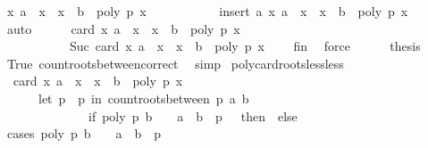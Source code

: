 \begin{isabellebody}
\ {\isachardoublequoteopen}{\isacharbraceleft}x{\isachardot}\ a\ {\isasymle}\ x\ {\isasymand}\ x\ {\isasymle}\ b\ {\isasymand}\ poly\ p\ x\ {\isacharequal}\ {}{\isacharbraceright}\ {\isacharequal}\isanewline
\ \ \ \ \ \ \ \ insert\ a\ {\isacharbraceleft}x{\isachardot}\ a\ {\isacharless}\ x\ {\isasymand}\ x\ {\isasymle}\ b\ {\isasymand}\ poly\ p\ x\ {\isacharequal}\ {}{\isacharbraceright}{\isachardoublequoteclose}\ \isamarkupfalse%
\ auto\isanewline
\ \ \ \ \isamarkupfalse%
\ {\isachardoublequoteopen}card\ {\isacharbraceleft}x{\isachardot}\ a\ {\isasymle}\ x\ {\isasymand}\ x\ {\isasymle}\ b\ {\isasymand}\ poly\ p\ x\ {\isacharequal}\ {}{\isacharbraceright}\ {\isacharequal}\isanewline
\ \ \ \ \ \ \ \ \ \ \ Suc\ {\isacharparenleft}card\ {\isacharbraceleft}x{\isachardot}\ a\ {\isacharless}\ x\ {\isasymand}\ x\ {\isasymle}\ b\ {\isasymand}\ poly\ p\ x\ {\isacharequal}\ {}{\isacharbraceright}{\isacharparenright}{\isachardoublequoteclose}\ \isamarkupfalse%
\ fin\ \isamarkupfalse%
\ force\isanewline
\ \ \ \ \isamarkupfalse%
\ {\isacharquery}thesis\ \isamarkupfalse%
\ True\ count{\isacharunderscore}roots{\isacharunderscore}between{\isacharunderscore}correct\ \isamarkupfalse%
\ simp\isanewline
{}\isamarkupfalse%
%
\endisatagproof
{\isafoldproof}%
%
\isadelimproof
\isanewline
%
\endisadelimproof
\isanewline
{}\isamarkupfalse%
\ poly{\isacharunderscore}card{\isacharunderscore}roots{\isacharunderscore}less{\isacharunderscore}less{\isacharcolon}\isanewline
\ \ {\isachardoublequoteopen}card\ {\isacharbraceleft}x{\isachardot}\ a\ {\isacharless}\ x\ {\isasymand}\ x\ {\isacharless}\ b\ {\isasymand}\ poly\ p\ x\ {\isacharequal}\ {}{\isacharbraceright}\ {\isacharequal}\ \isanewline
\ \ \ \ \ \ {\isacharparenleft}let\ p\ {\isacharequal}\ p\ in\ count{\isacharunderscore}roots{\isacharunderscore}between\ p\ a\ b\ {\isacharminus}\isanewline
\ \ \ \ \ \ \ \ \ \ \ \ \ \ {\isacharparenleft}if\ poly\ p\ b\ {\isacharequal}\ {}\ {\isasymand}\ a\ {\isacharless}\ b\ {\isasymand}\ p\ {\isasymnoteq}\ {}\ then\ {}\ else\ {}{\isacharparenright}{\isacharparenright}{\isachardoublequoteclose}\isanewline
%
\isadelimproof
%
\endisadelimproof
%
\isatagproof
{}\isamarkupfalse%
\ {\isacharparenleft}cases\ {\isachardoublequoteopen}poly\ p\ b\ {\isacharequal}\ {}\ {\isasymand}\ a\ {\isacharless}\ b\ {\isasymand}\ p\ {\isasymnoteq}\ {}{\isachardoublequoteclose}{\isacharparenright}\isanewline

\end{isabellebody}
